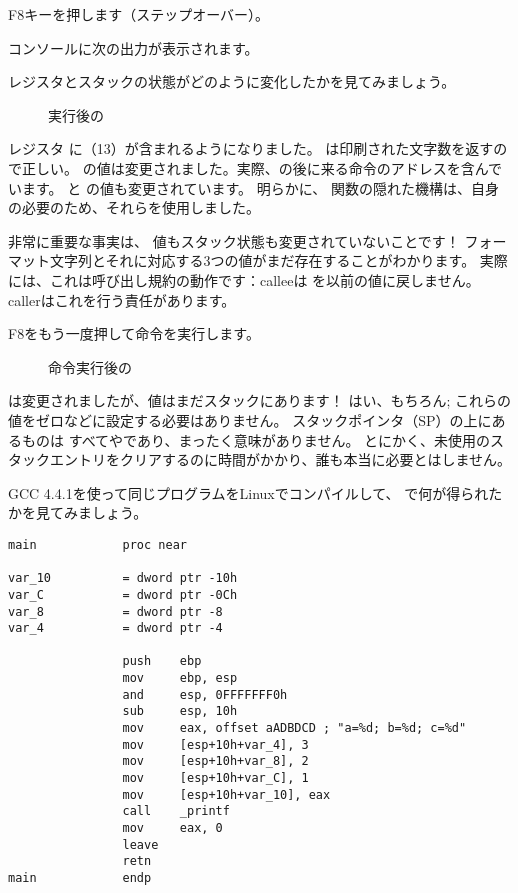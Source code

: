 \clearpage
F8キーを押します（ステップオーバー）。

コンソールに次の出力が表示されます。



レジスタとスタックの状態がどのように変化したかを見てみましょう。

\begin{figure}[H]
\centering
{}
\caption{\printf{} 実行後の \olly }
\label{fig:printf3_olly_3}
\end{figure}

レジスタ \EAX に（13）が含まれるようになりました。 
\printf は印刷された文字数を返すので正しい。 
\EIP の値は変更されました。実際、の後に来る命令のアドレスを含んでいます。 
\ECX と \EDX の値も変更されています。 
明らかに、 \printf 関数の隠れた機構は、自身の必要のため、それらを使用しました。

非常に重要な事実は、 \ESP 値もスタック状態も変更されていないことです！
フォーマット文字列とそれに対応する3つの値がまだ存在することがわかります。
実際には、これは呼び出し規約の動作です：\gls{callee}は \ESP を以前の値に戻しません。 
\gls{caller}はこれを行う責任があります。

\clearpage
F8をもう一度押して命令を実行します。

\begin{figure}[H]
\centering
{}
\caption{命令実行後の \olly }
\label{fig:printf3_olly_4}
\end{figure}

\ESP は変更されましたが、値はまだスタックにあります！ 
はい、もちろん; これらの値をゼロなどに設定する必要はありません。 
スタックポインタ（\ac{SP}）の上にあるものは
すべてや\IT{\garbage{}}であり、まったく意味がありません。
とにかく、未使用のスタックエントリをクリアするのに時間がかかり、誰も本当に必要とはしません。

GCC 4.4.1を使って同じプログラムをLinuxでコンパイルして、 \IDA で何が得られたかを見てみましょう。

\begin{lstlisting}[style=customasmx86]
main            proc near

var_10          = dword ptr -10h
var_C           = dword ptr -0Ch
var_8           = dword ptr -8
var_4           = dword ptr -4

                push    ebp
                mov     ebp, esp
                and     esp, 0FFFFFFF0h
                sub     esp, 10h
                mov     eax, offset aADBDCD ; "a=%d; b=%d; c=%d"
                mov     [esp+10h+var_4], 3
                mov     [esp+10h+var_8], 2
                mov     [esp+10h+var_C], 1
                mov     [esp+10h+var_10], eax
                call    _printf
                mov     eax, 0
                leave
                retn
main            endp
\end{lstlisting}

